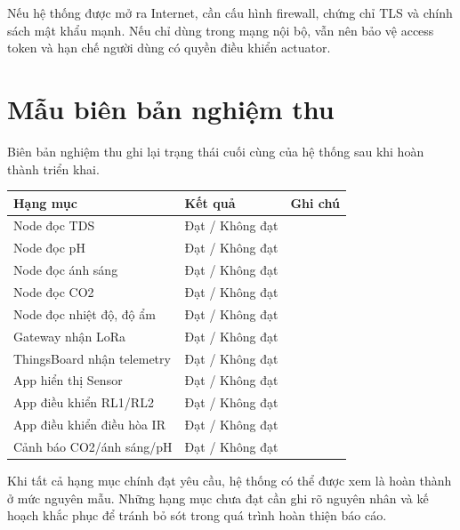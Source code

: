 Nếu hệ thống được mở ra Internet, cần cấu hình firewall, chứng chỉ TLS và chính sách mật khẩu mạnh. Nếu chỉ dùng trong mạng nội bộ, vẫn nên bảo vệ access token và hạn chế người dùng có quyền điều khiển actuator.

\section{Mẫu biên bản nghiệm thu}
Biên bản nghiệm thu ghi lại trạng thái cuối cùng của hệ thống sau khi hoàn thành triển khai.

\begin{longtable}{|p{4cm}|p{3cm}|p{5.5cm}|}
\hline
\textbf{Hạng mục} & \textbf{Kết quả} & \textbf{Ghi chú} \\
\hline
Node đọc TDS & Đạt / Không đạt &  \\
\hline
Node đọc pH & Đạt / Không đạt &  \\
\hline
Node đọc ánh sáng & Đạt / Không đạt &  \\
\hline
Node đọc CO2 & Đạt / Không đạt &  \\
\hline
Node đọc nhiệt độ, độ ẩm & Đạt / Không đạt &  \\
\hline
Gateway nhận LoRa & Đạt / Không đạt &  \\
\hline
ThingsBoard nhận telemetry & Đạt / Không đạt &  \\
\hline
App hiển thị Sensor & Đạt / Không đạt &  \\
\hline
App điều khiển RL1/RL2 & Đạt / Không đạt &  \\
\hline
App điều khiển điều hòa IR & Đạt / Không đạt &  \\
\hline
Cảnh báo CO2/ánh sáng/pH & Đạt / Không đạt &  \\
\hline
\end{longtable}

Khi tất cả hạng mục chính đạt yêu cầu, hệ thống có thể được xem là hoàn thành ở mức nguyên mẫu. Những hạng mục chưa đạt cần ghi rõ nguyên nhân và kế hoạch khắc phục để tránh bỏ sót trong quá trình hoàn thiện báo cáo.
